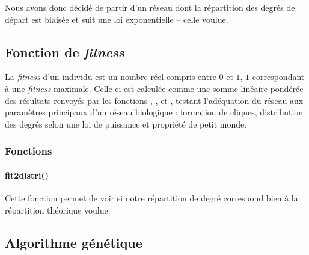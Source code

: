 Nous avons donc décidé de partir d'un réseau dont la répartition des degrés de départ est biaisée et suit une loi exponentielle -- celle voulue.

\subsection{Fonction de \textit{fitness} }
\label{fitness}
La \textit{fitness} d'un individu est un nombre réel compris entre $0$ et $1$, $1$ correspondant à une \textit{fitness} maximale.
Celle-ci est calculée comme une somme linéaire pondérée des résultats renvoyés par les fonctions \texttt{}, \texttt{}, et \texttt{}, testant l'adéquation du réseau aux paramètres principaux d'un réseau biologique : formation de cliques, distribution des degrés selon une loi de puissance et propriété de petit monde.

\subsubsection{Fonctions}
\paragraph*{fit2distri()} Cette fonction permet de voir si notre répartition de degré correspond bien à  la répartition théorique voulue.

\subsection{Algorithme génétique}
%
%
%
%

